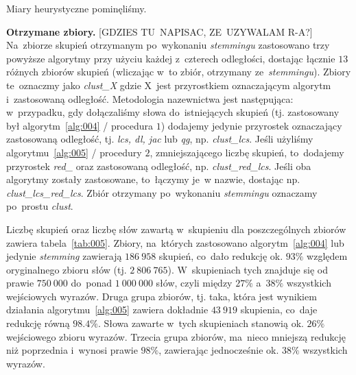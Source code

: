 \documentclass{praca1}
\begin{document}
Miary heurystyczne pominęliśmy.

\textbf{Otrzymane zbiory.} [GDZIES TU~NAPISAC, ZE~UZYWALAM R-A?] Na~zbiorze skupień otrzymanym po~wykonaniu \emph{stemmingu} zastosowano trzy powyższe algorytmy przy użyciu każdej z~czterech odległości, dostając łącznie $13$ różnych zbiorów skupień (wliczając w~to zbiór, otrzymany ze~\emph{stemmingu}). Zbiory te~oznaczmy jako \emph{clust\_X} gdzie X~jest przyrostkiem oznaczającym algorytm i~zastosowaną odległość. Metodologia nazewnictwa jest następująca: w~przypadku, gdy dołączaliśmy słowa do~istniejących skupień (tj. zastosowany był algorytm~\ref{alg:004} / procedura $1$) dodajemy jedynie przyrostek oznaczający zastosowaną odległość, tj. \emph{lcs, dl, jac} lub \emph{qg}, np. \emph{clust\_lcs}. Jeśli użyliśmy algorytmu~\ref{alg:005} / procedury $2$, zmniejszającego liczbę skupień, to~dodajemy przyrostek \emph{red\_} oraz zastosowaną odległość, np. \emph{clust\_red\_lcs}. Jeśli oba algorytmy zostały zastosowane, to~łączymy je~w nazwie, dostając np. \emph{clust\_lcs\_red\_lcs}. Zbiór otrzymany po~wykonaniu \emph{stemmingu} oznaczamy po~prostu \emph{clust}. 


Liczbę skupień oraz liczbę słów zawartą w~skupieniu dla poszczególnych zbiorów zawiera tabela~\ref{tab:005}. Zbiory, na~których zastosowano algorytm~\ref{alg:004} lub jedynie \emph{stemming} zawierają $186\ 958$ skupień, co~dało redukcję ok. $93\%$ względem oryginalnego zbioru słów (tj. $2\ 806\ 765$). W~skupieniach tych znajduje się od~ prawie $750\ 000$ do~ponad $1\ 000\ 000$ słów, czyli między $27\%$ a~$38\%$ wszystkich wejściowych wyrazów. Druga grupa zbiorów, tj. taka, która jest wynikiem działania algorytmu~\ref{alg:005} zawiera dokładnie $43\ 919$ skupienia, co~daje redukcję równą $98.4\%$. Słowa zawarte w~tych skupieniach stanowią ok. $26\%$ wejściowego zbioru wyrazów. Trzecia grupa zbiorów, ma~nieco mniejszą redukcję niż poprzednia i~wynosi prawie $98\%$, zawierając jednocześnie ok. $38\%$ wszystkich wyrazów.
\end{document}

